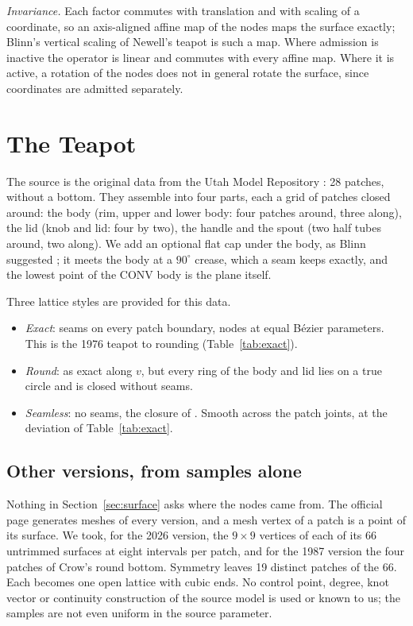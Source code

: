 \documentclass[journal]{IEEEtran}
\begin{document}
\emph{Invariance.} Each factor commutes with translation and with scaling
of a coordinate, so an axis-aligned affine map of the nodes maps the
surface exactly; Blinn's vertical scaling of Newell's teapot is such a
map. Where admission is inactive the operator is linear and commutes with
every affine map. Where it is active, a rotation of the nodes does not in
general rotate the surface, since coordinates are admitted separately.

\section{The Teapot}

The source is the original data from the Utah Model Repository
\cite{utahdata}: 28 patches, without a bottom. They assemble into four
parts, each a grid of patches closed around: the body (rim, upper and
lower body: four patches around, three along), the lid (knob and lid:
four by two), the handle and the spout (two half tubes around, two
along). We add an optional flat cap under the body, as Blinn suggested
\cite{blinn1987}; it meets the body at a $90^\circ$ crease, which a seam
keeps exactly, and the lowest point of the CONV body is the plane itself.

Three lattice styles are provided for this data.
\begin{itemize}
\item \emph{Exact}: seams on every patch boundary, nodes at equal
B\'ezier parameters. This is the 1976 teapot to rounding
(Table~\ref{tab:exact}).
\item \emph{Round}: as exact along $v$, but every ring of the body and
lid lies on a true circle and is closed without seams.
\item \emph{Seamless}: no seams, the closure of \cite{convpaper}. Smooth
across the patch joints, at the deviation of Table~\ref{tab:exact}.
\end{itemize}

\subsection{Other versions, from samples alone}

Nothing in Section~\ref{sec:surface} asks where the nodes came from. The
official page generates meshes of every version, and a mesh vertex of a
patch is a point of its surface. We took, for the 2026 version, the
$9\times9$ vertices of each of its 66 untrimmed surfaces at eight intervals
per patch, and for the 1987 version the four patches of Crow's round
bottom. Symmetry leaves 19 distinct patches of the 66. Each becomes one
open lattice with cubic ends. No control point, degree, knot vector or
continuity construction of the source model is used or known to us; the
samples are not even uniform in the source parameter.
\end{document}
